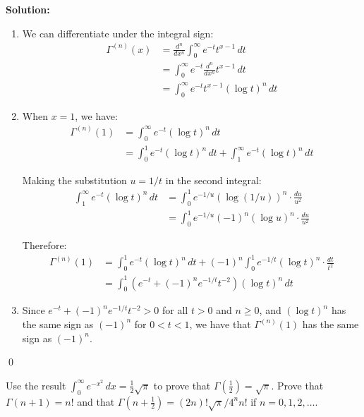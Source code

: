 \bigskip\noindent\textbf{Solution:}
\begin{enumerate}[label=(\alph*)]
\item We can differentiate under the integral sign:
\begin{align*}
\Gamma^{(n)}(x) &= \frac{d^{n}}{dx^{n}} \int_{0}^{\infty} e^{-t} t^{x-1} \, dt \\
&= \int_{0}^{\infty} e^{-t} \frac{d^{n}}{dx^{n}} t^{x-1} \, dt \\
&= \int_{0}^{\infty} e^{-t} t^{x-1} (\log t)^{n} \, dt
\end{align*}

\item When $x = 1$, we have:
\begin{align*}
\Gamma^{(n)}(1) &= \int_{0}^{\infty} e^{-t} (\log t)^{n} \, dt \\
&= \int_{0}^{1} e^{-t} (\log t)^{n} \, dt + \int_{1}^{\infty} e^{-t} (\log t)^{n} \, dt
\end{align*}

Making the substitution $u = 1/t$ in the second integral:
\begin{align*}
\int_{1}^{\infty} e^{-t} (\log t)^{n} \, dt &= \int_{0}^{1} e^{-1/u} (\log(1/u))^{n} \cdot \frac{du}{u^{2}} \\
&= \int_{0}^{1} e^{-1/u} (-1)^{n} (\log u)^{n} \cdot \frac{du}{u^{2}}
\end{align*}

Therefore:
\begin{align*}
\Gamma^{(n)}(1) &= \int_{0}^{1} e^{-t} (\log t)^{n} \, dt + (-1)^{n} \int_{0}^{1} e^{-1/t} (\log t)^{n} \cdot \frac{dt}{t^{2}} \\
&= \int_{0}^{1} (e^{-t} + (-1)^{n} e^{-1/t} t^{-2}) (\log t)^{n} \, dt
\end{align*}

\item Since $e^{-t} + (-1)^{n} e^{-1/t} t^{-2} > 0$ for all $t > 0$ and $n \geq 0$, and $(\log t)^{n}$ has the same sign as $(-1)^{n}$ for $0 < t < 1$, we have that $\Gamma^{(n)}(1)$ has the same sign as $(-1)^{n}$.
\end{enumerate}\qed


\begin{problembox}
\begin{problemstatement}
Use the result $\int_{0}^{\infty} e^{-x^{2}} \, dx = \frac{1}{2} \sqrt{\pi}$ to prove that $\Gamma(\frac{1}{2}) = \sqrt{\pi}$. Prove that $\Gamma(n + 1) = n!$ and that $\Gamma(n + \frac{1}{2}) = (2n)! \sqrt{\pi}/4^{n}n!$ if $n = 0, 1, 2, \ldots$.
\end{problemstatement}
\end{problembox}

